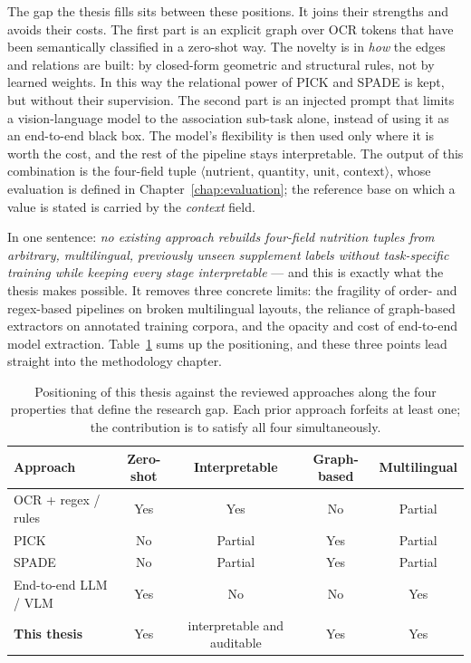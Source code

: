 The gap the thesis fills sits between these positions. It joins their strengths and avoids their costs. The first part is an explicit graph over OCR tokens that have been semantically classified in a zero-shot way. The novelty is in \emph{how} the edges and relations are built: by closed-form geometric and structural rules, not by learned weights. In this way the relational power of PICK and SPADE is kept, but without their supervision. The second part is an injected prompt that limits a vision-language model to the association sub-task alone, instead of using it as an end-to-end black box. The model's flexibility is then used only where it is worth the cost, and the rest of the pipeline stays interpretable. The output of this combination is the four-field tuple $\langle\text{nutrient},\,\text{quantity},\,\text{unit},\,\text{context}\rangle$, whose evaluation is defined in Chapter~\ref{chap:evaluation}; the reference base on which a value is stated is carried by the \emph{context} field.

In one sentence: \emph{no existing approach rebuilds four-field nutrition tuples from arbitrary, multilingual, previously unseen supplement labels without task-specific training while keeping every stage interpretable} --- and this is exactly what the thesis makes possible. It removes three concrete limits: the fragility of order- and regex-based pipelines on broken multilingual layouts, the reliance of graph-based extractors on annotated training corpora, and the opacity and cost of end-to-end model extraction. Table~\ref{tab:rw-positioning} sums up the positioning, and these three points lead straight into the methodology chapter.

\begin{table}[t]
  \centering
  \small
  \begin{tabular}{lcccc}
    \toprule
    Approach & Zero-shot & Interpretable & Graph-based & Multilingual \\
    \midrule
    OCR + regex / rules               & Yes     & Yes     & No  & Partial \\
    PICK \cite{yu2020pick}            & No      & Partial      & Yes & Partial \\
    SPADE \cite{hwang2021spade}       & No      & Partial & Yes & Partial \\
    End-to-end LLM / VLM              & Yes     & No      & No  & Yes     \\
    \textbf{This thesis}              & Yes     & interpretable and auditable     & Yes & Yes     \\
    \bottomrule
  \end{tabular}
  \caption{Positioning of this thesis against the reviewed approaches along the
  four properties that define the research gap. Each prior approach forfeits at
  least one; the contribution is to satisfy all four simultaneously.}
  \label{tab:rw-positioning}
\end{table}